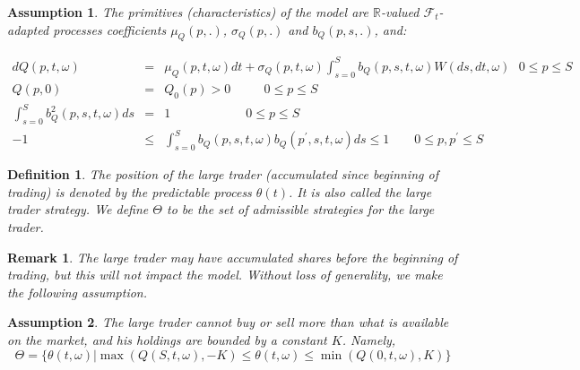 \documentclass{article}
\newtheorem{definition}{Definition}
\newtheorem{remark}{Remark}
\newtheorem{assumption}{Assumption}
\begin{document}

\begin{assumption}
\label{ass::primtive_Q_para} The primitives (characteristics) of the model
are $\mathbb{R}$-valued $\mathcal{F}_{t}$-adapted processes coefficients $%
\mu _{Q}(p,.)$, $\sigma _{Q}(p,.)$ and $b_{Q}(p,s,.)$, and:

\begin{eqnarray}
dQ(p,t,\omega ) &=&\mu _{Q}(p,t,\omega )dt+\sigma _{Q}(p,t,\omega
)\int_{s=0}^{S}b_{Q}(p,s,t,\omega )W(ds,dt,\omega )\text{ \ \ \ }0\leq p\leq
S  \label{GenMod1} \\
Q(p,0) &=&Q_{0}(p)>0\qquad \text{\ }0\leq p\leq S  \label{GenMod2} \\
\int_{s=0}^{S}b_{Q}^{2}(p,s,t,\omega )ds &=&1\qquad \qquad \qquad 0\leq
p\leq S  \label{GenMod3} \\
-1 &\leq &\int_{s=0}^{S}b_{Q}(p,s,t,\omega )b_{Q}(p^{\prime },s,t,\omega
)ds\leq 1\qquad 0\leq p,p^{\prime }\leq S
\end{eqnarray}
\end{assumption}



\begin{definition}
The position of the large trader (accumulated since beginning of trading) is
denoted by the predictable process $\theta (t)$. It is also called the
\textit{large trader strategy}. We define $\Theta $ to be the set of
admissible strategies for the large trader.
\end{definition}



\begin{remark}
The large trader may have accumulated shares before the beginning of
trading, but this will not impact the model. Without loss of generality, we
make the following assumption.
\end{remark}



\begin{assumption}
The large trader cannot buy or sell more than what is available on the
market, and his holdings are bounded by a constant $K$. Namely,%
\begin{equation*}
\Theta =\{\theta (t,\omega )|\max (Q(S,t,\omega ),-K)\leq \theta (t,\omega
)\leq \min (Q(0,t,\omega ),K)\}
\end{equation*}
\end{assumption}
\end{document}
